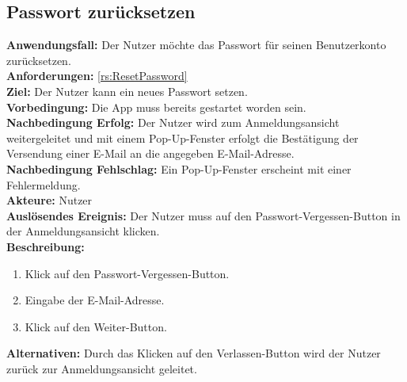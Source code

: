 \documentclass[parskip=full]{scrartcl}
\begin{document}
\subsection{Passwort zurücksetzen}
\textbf{Anwendungsfall:} Der Nutzer möchte das Passwort für seinen Benutzerkonto zurücksetzen.\\
\textbf{Anforderungen:} \ref{rs:ResetPassword}\\
\textbf{Ziel:} Der Nutzer kann ein neues Passwort setzen.\\
\textbf{Vorbedingung:} Die App muss bereits gestartet worden sein.\\
\textbf{Nachbedingung Erfolg:} Der Nutzer wird zum Anmeldungsansicht weitergeleitet und mit einem Pop-Up-Fenster erfolgt die Bestätigung der Versendung einer E-Mail an die angegeben E-Mail-Adresse.\\
\textbf{Nachbedingung Fehlschlag:} Ein Pop-Up-Fenster erscheint mit einer Fehlermeldung.\\
\textbf{Akteure:} Nutzer\\
\textbf{Auslösendes Ereignis:} Der Nutzer muss auf den Passwort-Vergessen-Button in der Anmeldungsansicht klicken.\\
\textbf{Beschreibung:}
\begin{enumerate}
    \item Klick auf den Passwort-Vergessen-Button.
    \item Eingabe der E-Mail-Adresse.
    \item Klick auf den Weiter-Button.
\end{enumerate}
\textbf{Alternativen:} Durch das Klicken auf den Verlassen-Button wird der Nutzer zurück zur Anmeldungsansicht geleitet.
\newpage
\end{document}
